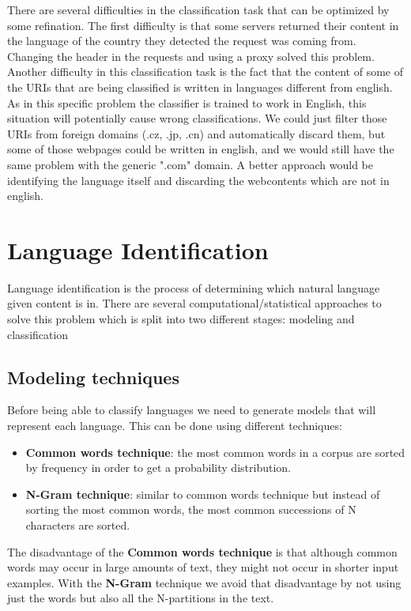 
There are several difficulties in the classification task that can be optimized by some refination. 
The first difficulty is that some servers returned their content in the language of the country they detected the request was coming from. Changing the header in the requests and using a proxy solved this problem.  
Another difficulty in this classification task is the fact that the content of some of the URIs that are being classified is written in languages different from english. 
As in this specific problem the classifier is trained to work in English, this situation will potentially cause wrong classifications. 
We could just filter those URIs from foreign domains (.cz, .jp, .cn) and automatically discard them, but some of those webpages could be written in english, and we would still have the same problem with the generic ".com" domain.
A better approach would be identifying the language itself and discarding the webcontents which are not in english.

\section{Language Identification}
Language identification is the process of determining which natural language given content is in. 
There are several computational/statistical approaches to solve this problem which is split into two different stages: modeling and classification

\subsection{Modeling techniques}
Before being able to classify languages we need to generate models that will represent each language. This can be done using different techniques:
\begin{itemize}
  \item {\bf Common words technique}: the most common words in a corpus are sorted by frequency in order to get a probability distribution.
  \item {\bf N-Gram technique}: similar to common words technique but instead of sorting the most common words, the most common successions of N characters are sorted.
\end{itemize}  
The disadvantage of the {\bf Common words technique} is that although common words may occur in large amounts of text, they might not occur in shorter input examples. With the {\bf N-Gram} technique we avoid that disadvantage by not using just the words but also all the N-partitions in the text.


